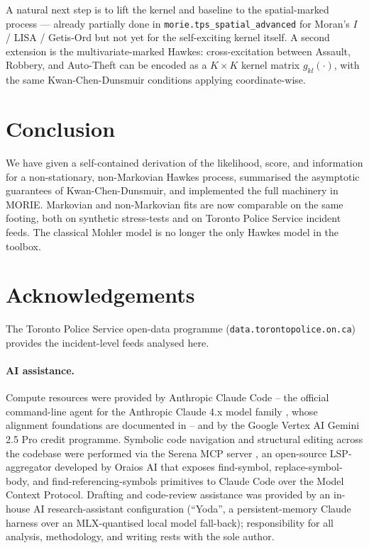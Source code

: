\documentclass[article,shortnames,nojss]{jss}
\newcommand{\1}{\mathbbm{1}}
\theoremstyle{plain}
\theoremstyle{definition}
\begin{document}
A natural next step is to lift the kernel and baseline to the
spatial-marked process --- already partially done in
\texttt{morie.tps\_spatial\_advanced} for Moran's $I$ / LISA /
Getis-Ord but not yet for the self-exciting kernel itself.  A
second extension is the multivariate-marked Hawkes:
cross-excitation between Assault, Robbery, and Auto-Theft can be
encoded as a $K\times K$ kernel matrix
$g_{kl}(\cdot)$, with the same Kwan-Chen-Dunsmuir conditions
applying coordinate-wise.

\section{Conclusion}\label{sec:conclusion}

We have given a self-contained derivation of the likelihood, score,
and information for a non-stationary, non-Markovian Hawkes process,
summarised the asymptotic guarantees of Kwan-Chen-Dunsmuir, and
implemented the full machinery in MORIE.  Markovian and
non-Markovian fits are now comparable on the same footing, both
on synthetic stress-tests and on Toronto Police Service incident
feeds.  The classical Mohler model is no longer the only Hawkes
model in the toolbox.

\section*{Acknowledgements}
The Toronto Police Service open-data programme
(\texttt{data.torontopolice.on.ca}) provides the incident-level
feeds analysed here.

\paragraph*{AI assistance.}
Compute resources were provided by Anthropic
Claude Code \citep{Anthropic2024ClaudeCode} -- the official
command-line agent for the Anthropic Claude 4.x model family
\citep{Anthropic2024ClaudeFamily}, whose alignment foundations
are documented in \citet{Bai2022ConstitutionalAI} -- and by the
Google Vertex AI \citep{GoogleCloud2024VertexAI} Gemini 2.5 Pro
\citep{GoogleDeepMind2024Gemini} credit programme.  Symbolic
code navigation and structural editing across the codebase were
performed via the Serena MCP server \citep{Oraios2024Serena}, an
open-source LSP-aggregator developed by Oraios AI that exposes
find-symbol, replace-symbol-body, and find-referencing-symbols
primitives to Claude Code over the Model Context Protocol.
Drafting and code-review assistance was provided by an in-house AI
research-assistant configuration (``Yoda'', a persistent-memory
Claude harness over an MLX-quantised local model fall-back);
responsibility for all analysis, methodology, and writing rests
with the sole author.
\end{document}
